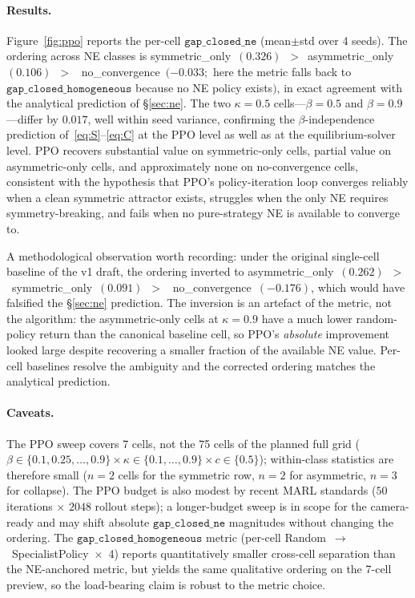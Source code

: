 \documentclass{anvil-paper}
\begin{document}
\paragraph{Results.}
Figure~\ref{fig:ppo} reports the per-cell $\texttt{gap\_closed\_ne}$
(mean$\pm$std over 4 seeds). The ordering across NE classes is
\textsf{symmetric\_only}~$(0.326)$~$>$~\textsf{asymmetric\_only}~$(0.106)$~$>$~%
\textsf{no\_convergence}~$(-0.033;$ here the metric falls back to
$\texttt{gap\_closed\_homogeneous}$ because no NE policy exists$)$, in
exact agreement with the analytical prediction of \S\ref{sec:ne}. The
two $\kappa{=}0.5$ cells---$\beta{=}0.5$ and $\beta{=}0.9$---differ by
$0.017$, well within seed variance, confirming the
$\beta$-independence prediction of~\eqref{eq:S}--\eqref{eq:C} at the PPO
level as well as at the equilibrium-solver level. PPO recovers
substantial value on symmetric-only cells, partial value on asymmetric-only
cells, and approximately none on no-convergence cells, consistent with the
hypothesis that PPO's policy-iteration loop converges reliably when a clean
symmetric attractor exists, struggles when the only NE requires
symmetry-breaking, and fails when no pure-strategy NE is available to
converge to.

A methodological observation worth recording: under the original
single-cell baseline of the v1 draft, the ordering inverted to
\textsf{asymmetric\_only}~$(0.262)$~$>$~\textsf{symmetric\_only}~$(0.091)$~$>$~%
\textsf{no\_convergence}~$(-0.176)$, which would have falsified the
\S\ref{sec:ne} prediction. The inversion is an artefact of the metric, not
the algorithm: the asymmetric-only cells at $\kappa{=}0.9$ have a much
lower random-policy return than the canonical baseline cell, so PPO's
\emph{absolute} improvement looked large despite recovering a smaller
fraction of the available NE value. Per-cell baselines resolve the
ambiguity and the corrected ordering matches the analytical prediction.

\paragraph{Caveats.}
The PPO sweep covers 7 cells, not the 75 cells of the planned full grid
($\beta\in\{0.1,0.25,\ldots,0.9\}\times\kappa\in\{0.1,\ldots,0.9\}\times
c\in\{0.5\}$); within-class statistics are therefore small ($n{=}2$ cells
for the symmetric row, $n{=}2$ for asymmetric, $n{=}3$ for collapse). The
PPO budget is also modest by recent MARL standards ($50$ iterations
$\times$ $2048$ rollout steps); a longer-budget sweep is in scope for the
camera-ready and may shift absolute $\texttt{gap\_closed\_ne}$ magnitudes
without changing the ordering. The $\texttt{gap\_closed\_homogeneous}$
metric (per-cell Random~$\to$~SpecialistPolicy~$\times$~4) reports
quantitatively smaller cross-cell separation than the NE-anchored metric,
but yields the same qualitative ordering on the 7-cell preview, so the
load-bearing claim is robust to the metric choice.
\end{document}
